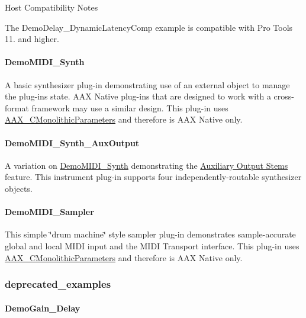 \begin{DoxyRefDesc}{Host Compatibility Notes}
\item[\hyperlink{a00380__compatibility_notes000009}{Host Compatibility Notes}]The Demo\+Delay\+\_\+\+Dynamic\+Latency\+Comp example is compatible with Pro Tools 11. and higher.\end{DoxyRefDesc}
\hypertarget{a00376_DemoMIDI_Synth}{}\paragraph{Demo\+M\+I\+D\+I\+\_\+\+Synth}\label{a00376_DemoMIDI_Synth}
A basic synthesizer plug-\/in demonstrating use of an external object to manage the plug-\/in\textquotesingle{}s state. A\+A\+X Native plug-\/ins that are designed to work with a cross-\/format framework may use a similar design. This plug-\/in uses \hyperlink{a00026}{A\+A\+X\+\_\+\+C\+Monolithic\+Parameters} and therefore is A\+A\+X Native only.\hypertarget{a00376_DemoMIDI_Synth_AuxOutput}{}\paragraph{Demo\+M\+I\+D\+I\+\_\+\+Synth\+\_\+\+Aux\+Output}\label{a00376_DemoMIDI_Synth_AuxOutput}
A variation on \hyperlink{a00376_DemoMIDI_Synth}{Demo\+M\+I\+D\+I\+\_\+\+Synth} demonstrating the \hyperlink{a00339}{Auxiliary Output Stems} feature. This instrument plug-\/in supports four independently-\/routable synthesizer objects.\hypertarget{a00376_DemoMIDI_Sampler}{}\paragraph{Demo\+M\+I\+D\+I\+\_\+\+Sampler}\label{a00376_DemoMIDI_Sampler}
This simple \char`\"{}drum machine\char`\"{} style sampler plug-\/in demonstrates sample-\/accurate global and local M\+I\+D\+I input and the M\+I\+D\+I Transport interface. This plug-\/in uses \hyperlink{a00026}{A\+A\+X\+\_\+\+C\+Monolithic\+Parameters} and therefore is A\+A\+X Native only.\hypertarget{a00376_deprecated_examples}{}\subsubsection{deprecated\+\_\+examples}\label{a00376_deprecated_examples}
\hypertarget{a00376_DemoGain_Delay}{}\paragraph{Demo\+Gain\+\_\+\+Delay}\label{a00376_DemoGain_Delay}
